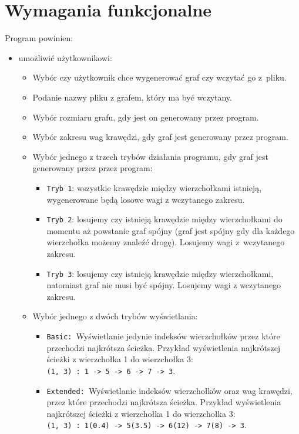 \documentclass[12pt, a4paper]{article}
\begin{document}
\section{Wymagania funkcjonalne}
Program powinien:
\begin{itemize}
\item umożliwić użytkownikowi:
    \begin{itemize}
        \item Wybór czy użytkownik chce wygenerować graf czy wczytać go z~pliku.
        \item Podanie nazwy pliku z grafem, który ma być wczytany.
        \item Wybór rozmiaru grafu, gdy jest on generowany przez program.
        \item Wybór zakresu wag krawędzi, gdy graf jest generowany przez program.
        \item Wybór jednego z trzech trybów działania programu, gdy graf jest generowany przez przez program:
        \begin{itemize}
            \item \texttt{Tryb 1}: wszystkie krawędzie między wierzchołkami istnieją, wygenerowane będą losowe wagi z wczytanego zakresu.
        	\item \texttt{Tryb 2}: losujemy czy istnieją krawędzie między wierzchołkami do momentu aż powstanie graf spójny (graf jest spójny gdy dla każdego wierzchołka możemy znaleźć drogę). Losujemy wagi z~wczytanego zakresu.
        	\item \texttt{Tryb 3}: losujemy czy istnieją krawędzie między wierzchołkami, natomiast graf nie musi być spójny. Losujemy wagi z wczytanego zakresu.
        \end{itemize}
        \item Wybór jednego z dwóch trybów wyświetlania:
        \begin{itemize}
            \item \texttt{Basic: }Wyświetlanie jedynie indeksów wierzchołków przez które przechodzi najkrótsza ścieżka. Przykład wyświetlenia najkrótszej ścieżki z wierzchołka 1 do wierzchołka 3:\\ \texttt{(1, 3) : 1 -> 5 -> 6 -> 7 -> 3}.
            \item \texttt{Extended: }Wyświetlanie indeksów wierzchołków oraz wag krawędzi, przez które przechodzi najkrótsza ścieżka. Przykład wyświetlenia najkrótszej ścieżki z wierzchołka 1 do wierzchołka 3:\\ \texttt{(1, 3) : 1(0.4) -> 5(3.5) -> 6(12) -> 7(8) -> 3}.

\end{itemize}
\end{itemize}
\end{itemize}
\end{document}
